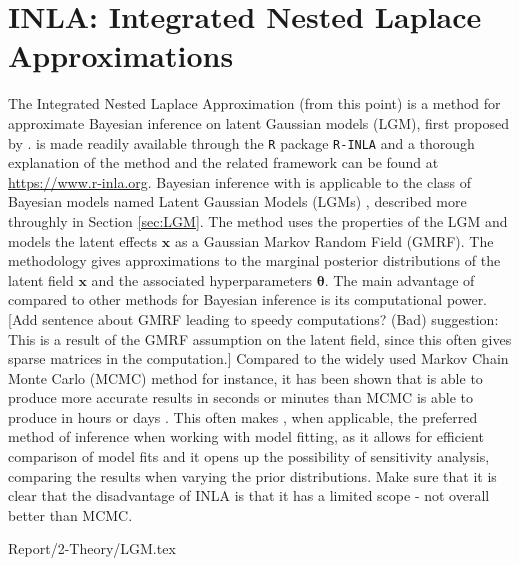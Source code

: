 \newpage
\section{INLA: Integrated Nested Laplace Approximations}
The Integrated Nested Laplace Approximation (\inla from this point) is a method for approximate Bayesian inference on latent Gaussian models (LGM), first proposed by \cite{rue2009inla}. \inla is made readily available through the \texttt{R} package \texttt{R-INLA} and a thorough explanation of the method and the related framework can be found at \url{https://www.r-inla.org}. 
Bayesian inference with \inla is applicable to the class of Bayesian models named Latent Gaussian Models (LGMs) \cite{rue2009inla}, described more throughly in Section \ref{sec:LGM}.  
\newline \newline
\noindent The \inla method uses the properties of the LGM and models the latent effects $\mathbf{x}$ as a Gaussian Markov Random Field (GMRF). The methodology gives approximations to the marginal posterior distributions of the latent field $\mathbf{x}$ and the associated hyperparameters $\boldsymbol{\theta}$. The main advantage of \inla compared to other methods for Bayesian inference is its computational power. [Add sentence about GMRF leading to speedy computations? (Bad) suggestion: This is a result of the GMRF assumption on the latent field, since this often gives sparse matrices in the computation.] Compared to the widely used Markov Chain Monte Carlo (MCMC) method for instance, it has been shown that \inla is able to produce more accurate results in seconds or minutes than MCMC is able to produce in hours or days \cite{rue2009inla}.
This often makes \inla, when applicable, the preferred method of inference when working with model fitting, as it allows for efficient comparison of model fits and it opens up the possibility of sensitivity analysis, comparing the results when varying the prior distributions. 
\textcolor{myDarkGreen}{Make sure that it is clear that the disadvantage of INLA is that it has a limited scope - not overall better than MCMC. }
 
{Report/2-Theory/LGM.tex}

